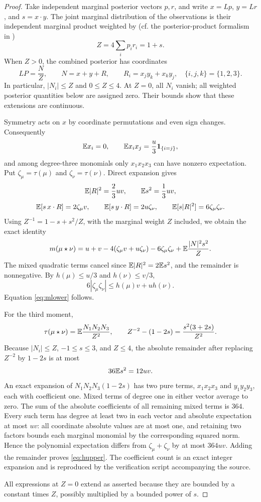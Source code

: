 \begin{proof}
Take independent marginal posterior vectors $p,r$, and write
$x=Lp$, $y=Lr$, and $s=x\cdot y$. The joint marginal distribution of the
observations is their independent marginal product weighted by
(cf. the posterior-product formalism in \cite{MM06})
\[
 Z=4\sum_i p_i r_i=1+s.
\]
When $Z>0$, the combined posterior has coordinates
\begin{equation}\label{eq:bayes}
 LP=\frac NZ,\qquad N=x+y+R,\qquad
 R_i=x_jy_k+x_ky_j,\quad\{i,j,k\}=\{1,2,3\}.
\end{equation}
In particular, $|N_i|\le Z$ and $0\le Z\le4$. At $Z=0$, all $N_i$
vanish; all weighted posterior quantities below are assigned zero. Their
bounds show that these extensions are continuous.

Symmetry acts on $x$ by coordinate permutations and even sign changes.
Consequently
\[
 \mathbb E x_i=0,\qquad \mathbb E x_ix_j=\frac u3\mathbf1_{\{i=j\}},
\]
and among degree-three monomials only $x_1x_2x_3$ can have nonzero
expectation. Put $\zeta_\mu=\tau(\mu)$ and $\zeta_\nu=\tau(\nu)$.
Direct expansion gives
\[
 \mathbb E|R|^2=\frac23uv,\qquad \mathbb E s^2=\frac13uv,
\]
\[
 \mathbb E[s\,x\cdot R]=2\zeta_\mu v,\qquad
 \mathbb E[s\,y\cdot R]=2u\zeta_\nu,\qquad
 \mathbb E[s|R|^2]=6\zeta_\mu\zeta_\nu.
\]
Using $Z^{-1}=1-s+s^2/Z$, with the marginal weight $Z$ included, we
obtain the exact identity
\begin{equation}\label{eq:exactm}
 m(\mu\star\nu)
 =u+v-4(\zeta_\mu v+u\zeta_\nu)-6\zeta_\mu\zeta_\nu
 +\mathbb E\frac{|N|^2s^2}{Z}.
\end{equation}
The mixed quadratic terms cancel since $\mathbb E|R|^2=2\mathbb E s^2$, and the remainder
is nonnegative. By $h(\mu)\le u/3$ and $h(\nu)\le v/3$,
\[
 6|\zeta_\mu\zeta_\nu|
 \le h(\mu)v+u h(\nu).
\]
Equation \eqref{eq:mlower} follows.

For the third moment,
\[
 \tau(\mu\star\nu)=\mathbb E\frac{N_1N_2N_3}{Z^2},\qquad
 Z^{-2}-(1-2s)=\frac{s^2(3+2s)}{Z^2}.
\]
Because $|N_i|\le Z$, $-1\le s\le3$, and $Z\le4$, the absolute remainder
after replacing $Z^{-2}$ by $1-2s$ is at most
\[
 36\mathbb E s^2=12uv.
\]
An exact expansion of $N_1N_2N_3(1-2s)$ has two pure terms,
$x_1x_2x_3$ and $y_1y_2y_3$, each with coefficient one. Mixed terms of
degree one in either vector average to zero. The sum of the absolute
coefficients of all remaining mixed terms is $364$. Every such term has
degree at least two in each vector and absolute expectation at most $uv$:
all coordinate absolute values are at most one, and retaining two factors
bounds each marginal monomial by the corresponding squared norm. Hence the
polynomial expectation differs from $\zeta_\mu+\zeta_\nu$ by at most
$364uv$. Adding the remainder proves \eqref{eq:hupper}. The coefficient
count is an exact integer expansion and is reproduced by the verification
script accompanying the source.

All expressions at $Z=0$ extend as asserted because they are bounded by a
constant times $Z$, possibly multiplied by a bounded power of $s$.
\end{proof}

